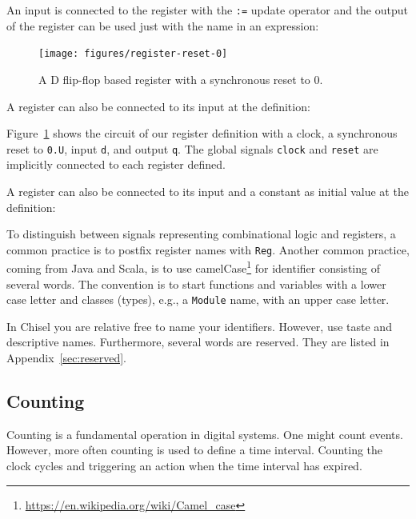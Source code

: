 \documentclass[%
    10pt,
    headinclude, footexclude,
    openright, %
    notitlepage,
    cleardoubleempty,
    headsepline,
    pointlessnumbers,
    bibtotoc, idxtotoc,
    ]{scrbook}
\newcommand{\code}[1]{{\small{\texttt{#1}}}}
\newcommand{\myref}[2]{\href{#1}{#2}}
\renewcommand{\myref}[2]{{#2}{\footnote{\url{#1}}}}
\begin{document}

\noindent An input is connected to the register with the \code{:=} update operator and
the output of the register can be used just with the name in an expression:


\begin{figure}
  \centering
  \texttt{[image: figures/register-reset-0]}
  \caption{A D flip-flop based register with a synchronous reset to 0.}
  \label{fig:register-reset-0}
\end{figure}

\noindent A register can also be connected to its input at the definition:


Figure~\ref{fig:register-reset-0} shows the circuit of our register definition with
a clock, a synchronous reset to \code{0.U}, input \code{d}, and output \code{q}.
The global signals \code{clock} and \code{reset} are implicitly connected to
each register defined.

\noindent A register can also be connected to its input and a constant as
initial value at the definition:


\noindent To distinguish between signals representing combinational logic and registers,
a common practice is to postfix register names with \code{Reg}.
Another common practice, coming from Java and Scala, is to use
\myref{https://en.wikipedia.org/wiki/Camel_case}{camelCase} for
identifier consisting of several words. The convention is to start
functions and variables with a lower case letter and classes (types),
e.g., a \code{Module} name, with an upper case letter.

In Chisel you are relative free to name your identifiers. However, use taste and
descriptive names. Furthermore, several words are reserved. They are listed
in Appendix~\ref{sec:reserved}.




\subsection{Counting}

Counting is a fundamental operation in digital systems. One might count events.
However, more often counting is used to define a time interval. Counting the
clock cycles and triggering an action when the time interval has expired.
\end{document}
